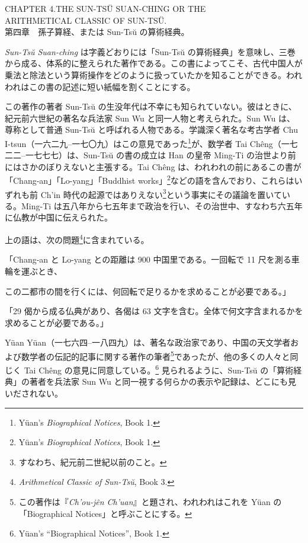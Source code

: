 \documentclass[11pt]{article}
\newcommand{\scanpage}[2]{\clearpage\setcounter{footnote}{0}\noindent{\footnotesize\color{gray}PDF #1 頁 · #2}\par\medskip}
\newcommand{\scanfooter}{}
\begin{document}
\begin{center}
CHAPTER 4.\quad THE SUN-TSÜ SUAN-CHING OR THE\\
ARITHMETICAL CLASSIC OF SUN-TSÜ.\\
第四章　孫子算経、または Sun-Tsŭ の算術経典。
\end{center}

\emph{Sun-Tsŭ Suan-ching} は字義どおりには「Sun-Tsŭ の算術経典」を意味し、三巻から成る、体系的に整えられた著作である。この書によってこそ、古代中国人が乗法と除法という算術操作をどのように扱っていたかを知ることができる。われわれはこの書の記述に短い紙幅を割くことにする。

この著作の著者 Sun-Tsŭ の生没年代は不幸にも知られていない。彼はときに、紀元前六世紀の著名な兵法家 Sun Wu と同一人物と考えられた。Sun Wu は、尊称として普通 Sun-Tsŭ と呼ばれる人物である。学識深く著名な考古学者 Chu I-tsun（一六二九--一七〇九）はこの意見であった\footnote{Yüan's \emph{Biographical Notices}, Book 1.}が、数学者 Tai Chêng（一七二二--一七七七）は、Sun-Tsŭ の書の成立は Han の皇帝 Ming-Ti の治世より前にはさかのぼりえないと主張する。Tai Chêng は、われわれの前にあるこの書が「Chang-an」「Lo-yang」「Buddhist works」\footnote{Yüan's \emph{Biographical Notices}, Book 1.}などの語を含んでおり、これらはいずれも前 Ch'in 時代の起源ではありえない\footnote{すなわち、紀元前二世紀以前のこと。}という事実にその議論を置いている。Ming-Ti は五八年から七五年まで政治を行い、その治世中、すなわち六五年に仏教が中国に伝えられた。

上の語は、次の問題\footnote{\emph{Arithmetical Classic of Sun-Tsŭ}, Book 3.}に含まれている。

「Chang-an と Lo-yang との距離は 900 中国里である。一回転で 11 尺を測る車輪を運ぶとき、
\scanfooter

\scanpage{0040}{第四章、印刷頁26}
\setcounter{footnote}{0}
この二都市の間を行くには、何回転で足りるかを求めることが必要である。」

「29 偈から成る仏典があり、各偈は 63 文字を含む。全体で何文字含まれるかを求めることが必要である。」

Yüan Yüan（一七六四--一八四九）は、著名な政治家であり、中国の天文学者および数学者の伝記的記事に関する著作の筆者\footnote{この著作は『\emph{Ch'ou-jên Ch'uan}』と題され、われわれはこれを Yüan の「Biographical Notices」と呼ぶことにする。}であったが、他の多くの人々と同じく Tai Chêng の意見に同意している。\footnote{Yüan's ``Biographical Notices'', Book 1.} 見られるように、Sun-Tsŭ の「算術経典」の著者を兵法家 Sun Wu と同一視する何らかの表示や記録は、どこにも見いだされない。
\end{document}
